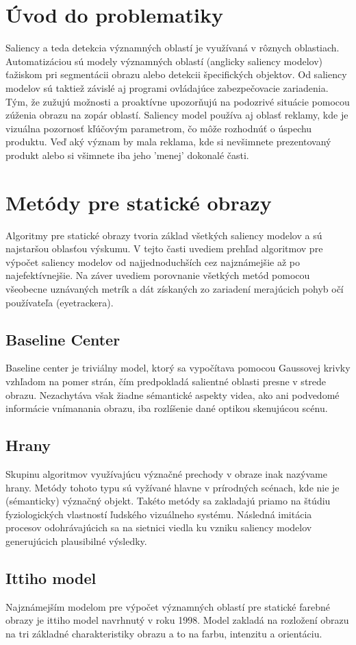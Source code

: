 \section{Úvod do problematiky}
Saliency a teda detekcia významných oblastí je využívaná v rôznych oblastiach.
Automatizáciou sú modely významných oblastí (anglicky saliency modelov) ťažiskom pri segmentácii obrazu alebo detekcii špecifických objektov.
Od saliency modelov sú taktiež závislé aj programi ovládajúce zabezpečovacie zariadenia.
Tým, že zužujú možnosti a proaktívne upozorňujú na podozrivé situácie pomocou zúženia obrazu na zopár oblastí.
Saliency model používa aj oblasť reklamy, kde je vizuálna pozornosť kľúčovým parametrom, čo môže rozhodnúť o úspechu produktu.
Veď aký význam by mala reklama, kde si nevšimnete prezentovaný produkt alebo si všimnete iba jeho 'menej' dokonalé časti.
\section{Metódy pre statické obrazy}
Algoritmy pre statické obrazy tvoria základ všetkých saliency modelov a sú najstaršou oblasťou výskumu.
V tejto časti uvediem prehľad algoritmov pre výpočet saliency modelov od najjednoduchších cez najznámejšie až po najefektívnejšie.
Na záver uvediem porovnanie všetkých metód pomocou všeobecne uznávaných metrík a dát získaných zo zariadení merajúcich pohyb očí používateľa (eyetrackera).
\subsection{Baseline Center}\label{section:caseline-center}
Baseline center je triviálny model, ktorý sa vypočítava pomocou Gaussovej krivky vzhľadom na pomer strán, čím predpokladá salientné oblasti presne v strede obrazu.
Nezachytáva však žiadne sémantické aspekty videa, ako ani podvedomé informácie vnímanania obrazu, iba rozlíšenie dané optikou skenujúcou scénu.
\subsection{Hrany}
Skupinu algoritmov využívajúcu význačné prechody v obraze inak nazývame hrany.
Metódy tohoto typu sú vyžívané hlavne v prírodných scénach, kde nie je (sémanticky) význačný objekt.
Takéto metódy sa zakladajú priamo na štúdiu fyziologických vlastností ľudského vizuálneho systému.
Následná imitácia procesov odohrávajúcich sa na sietnici viedla ku vzniku saliency modelov generujúcich plausibilné výsledky\cite{edges-1}.
\subsection{Ittiho model}
Najznámejším modelom pre výpočet významných oblastí pre statické farebné obrazy je ittiho model navrhnutý v roku 1998.
Model zakladá na rozložení obrazu na tri základné charakteristiky obrazu a to na farbu, intenzitu a orientáciu.

